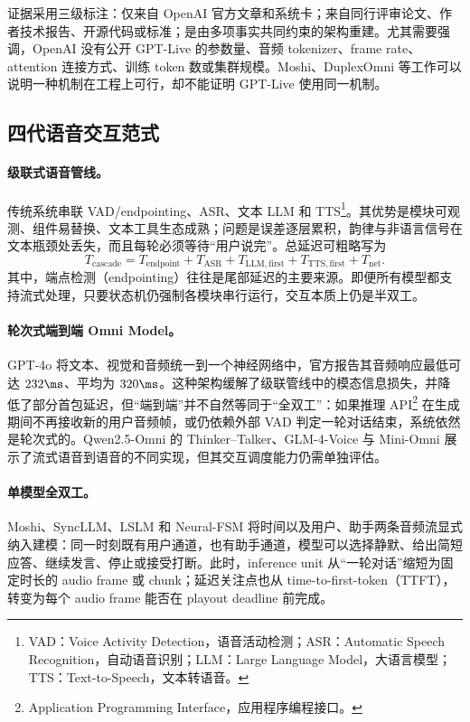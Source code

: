 证据采用三级标注：\FOne 仅来自 OpenAI 官方文章和系统卡；\FTwo 来自同行评审论文、作者技术报告、开源代码或标准；\Hyp 是由多项事实共同约束的架构重建。尤其需要强调，OpenAI 没有公开 GPT-Live 的参数量、音频 tokenizer、frame rate、attention 连接方式、训练 token 数或集群规模。Moshi、DuplexOmni 等工作可以说明一种机制在工程上可行，却不能证明 GPT-Live 使用同一机制。

\subsection{四代语音交互范式}

\paragraph{级联式语音管线。}
传统系统串联 VAD/endpointing、ASR、文本 LLM 和 TTS\footnote{VAD：Voice Activity Detection，语音活动检测；ASR：Automatic Speech Recognition，自动语音识别；LLM：Large Language Model，大语言模型；TTS：Text-to-Speech，文本转语音。}。其优势是模块可观测、组件易替换、文本工具生态成熟；问题是误差逐层累积，韵律与非语言信号在文本瓶颈处丢失，而且每轮必须等待“用户说完”。总延迟可粗略写为
\begin{equation}
T_{\mathrm{cascade}}=T_{\mathrm{endpoint}}+T_{\mathrm{ASR}}+T_{\mathrm{LLM,first}}+T_{\mathrm{TTS,first}}+T_{\mathrm{net}}.
\end{equation}
其中，端点检测（endpointing）往往是尾部延迟的主要来源。即便所有模型都支持流式处理，只要状态机仍强制各模块串行运行，交互本质上仍是半双工。

\paragraph{轮次式端到端 Omni Model。}
GPT-4o 将文本、视觉和音频统一到一个神经网络中，官方报告其音频响应最低可达 $232\ms$、平均为 $320\ms$\cite{openai2024gpt4osystemcard}。\FOne 这种架构缓解了级联管线中的模态信息损失，并降低了部分首包延迟，但“端到端”并不自然等同于“全双工”：如果推理 API\footnote{Application Programming Interface，应用程序编程接口。} 在生成期间不再接收新的用户音频帧，或仍依赖外部 VAD 判定一轮对话结束，系统依然是轮次式的。Qwen2.5-Omni 的 Thinker--Talker、GLM-4-Voice 与 Mini-Omni 展示了流式语音到语音的不同实现\cite{xu2025qwenomni,zeng2024glm4voice,xie2024miniomni}，但其交互调度能力仍需单独评估。

\paragraph{单模型全双工。}
Moshi、SyncLLM、LSLM 和 Neural-FSM 将时间以及用户、助手两条音频流显式纳入建模：同一时刻既有用户通道，也有助手通道，模型可以选择静默、给出简短应答、继续发言、停止或接受打断\cite{defossez2024moshi,veluri2024syncllm,ma2025lslm,wang2024neuralfsm}。此时，inference unit 从“一轮对话”缩短为固定时长的 audio frame 或 chunk；延迟关注点也从 time-to-first-token（TTFT），转变为每个 audio frame 能否在 playout deadline 前完成。

